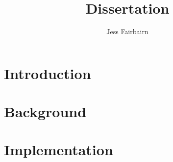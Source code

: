 \documentclass{article}
\author{Jess Fairbairn}
\title{Dissertation}
\begin{document}
        \maketitle
        \section{Introduction}

        \section{Background}
        
        
    
        \section{Implementation}
         

        
        
    
\end{document}
